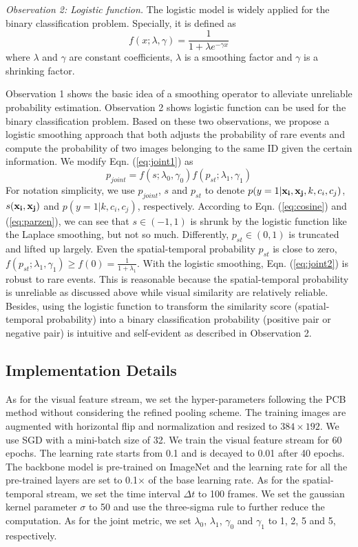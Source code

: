 \documentclass[letterpaper]{article} %
\begin{document}
\emph{Observation 2: Logistic function.} The logistic model is widely applied for the binary classification problem. Specially, it is defined as
\begin{equation}
    \label{eq:logistic}
    f(x;\lambda, \gamma) = \frac{1}{{1 + {{\lambda}}{e^{ - {\gamma}x}}}}
\end{equation}
where ${\lambda}$ and ${\gamma}$ are constant coefficients, ${\lambda}$ is a smoothing factor and ${\gamma}$ is a shrinking factor.


Observation 1 shows the basic idea of a smoothing operator to alleviate unreliable probability estimation. Observation 2 shows logistic function can be used for the binary classification problem. Based on these two observations, we propose a logistic smoothing approach that both adjusts the probability of rare events and compute the probability of two images belonging to the same ID given the certain information. We modify Eqn. (\ref{eq:joint1}) as
\begin{equation}
    \label{eq:joint2}
    {p_{joint}} = f(s;{\lambda}_0,{\gamma}_0)f({p_{st}};{\lambda}_1,{\gamma}_1)
\end{equation}
For notation simplicity, we use $p_{joint}$, $s$ and $p_{st}$ to denote $p(y=1|{\bf{x_i}},{\bf{x_j}},k,c_i,c_j)$, $s({\bf{x_i}},{\bf{x_j}})$ and $p(y=1|k,c_i,c_j)$, respectively. According to Eqn. (\ref{eq:cosine}) and (\ref{eq:parzen}), we can see that $s \in(-1,1)$ is shrunk by the logistic function like the Laplace smoothing, but not so much. Differently, $p_{st}\in (0,1)$ is truncated and lifted up largely. Even the spatial-temporal probability $p_{st}$ is close to zero, $f({p_{st}};{\lambda}_1,{\gamma}_1)\ge f(0)=\frac{{{1}}}{1+{\lambda}_1}$. With the logistic smoothing, Eqn. (\ref{eq:joint2}) is robust to rare events. This is reasonable because the spatial-temporal probability is unreliable as discussed above while visual similarity are relatively reliable. Besides, using the logistic function to transform the similarity score (spatial-temporal probability) into a binary classification probability (positive pair or negative pair) is intuitive and self-evident as described in Observation 2.

\subsection{Implementation Details}
As for the visual feature stream, we set the hyper-parameters following the PCB method \cite{Yifan2017arxiv} without considering the refined pooling scheme. The training images are augmented with horizontal flip and normalization and resized to $384\times 192$. We use SGD with a mini-batch size of 32. We train the visual feature stream for 60 epochs. The learning rate starts from 0.1 and is decayed to 0.01 after 40 epochs. The backbone model is pre-trained on ImageNet and the learning rate for all the pre-trained layers are set to 0.1$\times$  of the base learning rate. As for the spatial-temporal stream, we set the time interval $\Delta t$ to 100 frames. We set the gaussian kernel parameter $\sigma$ to 50 and use the three-sigma rule to further reduce the computation. As for the joint metric, we set ${\lambda}_0$, ${\lambda}_1$, ${\gamma}_0$ and ${\gamma}_1$ to 1, 2, 5 and 5, respectively.
\end{document}
